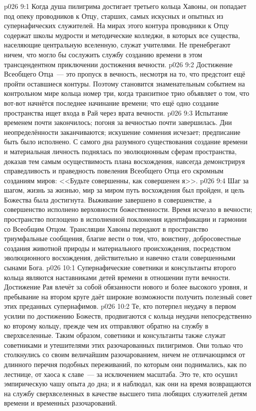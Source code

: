 \vs p026 9:1 Когда душа пилигрима достигает третьего кольца Хавоны, он попадает под опеку проводников к Отцу, старших, самых искусных и опытных из супернафических служителей. На мирах этого контура проводники к Отцу содержат школы мудрости и методические колледжи, в которых все существа, населяющие центральную вселенную, служат учителями. Не пренебрегают ничем, что могло бы сослужить службу созданию времени в этом трансцендентном приключении достижения вечности.
\vs p026 9:2 Достижение Всеобщего Отца~--- это пропуск в вечность, несмотря на то, что предстоит ещё пройти оставшиеся контуры. Поэтому становится знаменательным событием на контрольном мире кольца номер три, когда транзитное трио объявляет о том, что вот\hyp{}вот начнётся последнее начинание времени; что ещё одно создание пространства ищет входа в Рай через врата вечности.
\vs p026 9:3 \pc Испытание временем почти закончилось; погоня за вечностью почти завершилась. Дни неопределённости заканчиваются; искушение сомнения исчезает; предписание быть  было исполнено. С самого дна разумного существования создание времени и материальная личность поднялась по эволюционным сферам пространства, доказав тем самым осуществимость плана восхождения, навсегда демонстрируя справедливость и праведность повеления Всеобщего Отца его скромным созданиям миров: <<Будьте совершенны, как совершенен я>>.
\vs p026 9:4 Шаг за шагом, жизнь за жизнью, мир за миром путь восхождения был пройден, и цель Божества была достигнута. Выживание завершено в совершенстве, а совершенство исполнено верховности божественности. Время исчезло в вечности; пространство поглощено в исполненной поклонения идентификации и гармонии со Всеобщим Отцом. Трансляции Хавоны передают в пространство триумфальные сообщения, благие вести о том, что, воистину, добросовестные создания животной природы и материального происхождения, посредством эволюционного восхождения, действительно и навечно стали совершенными сынами Бога.
\vs p026 10:1 Супернафические советники и консультанты второго кольца являются наставниками детей времени в отношении пути вечности. Достижение Рая влечёт за собой обязанности нового и более высокого уровня, и пребывание на втором круге даёт широкие возможности получить полезный совет этих преданных супернафимов.
\vs p026 10:2 \pc Те, кто потерпел неудачу в первом усилии по достижению Божеств, продвигаются с кольца неудачи непосредственно ко второму кольцу, прежде чем их отправляют обратно на службу в сверхвселенные. Таким образом, советники и консультанты также служат советниками и утешителями этих разочарованных пилигримов. Они только что столкнулись со своим величайшим разочарованием, ничем не отличающимся от длинного перечня подобных переживаний, по которым они поднимались, как по лестнице, от хаоса к славе~--- за исключением масштаба. Это те, кто осушил эмпирическую чашу опыта до дна; и я наблюдал, как они на время возвращаются на службу сверхвселенных в качестве высшего типа любящих служителей детям времени и временн\'ых разочарований.
